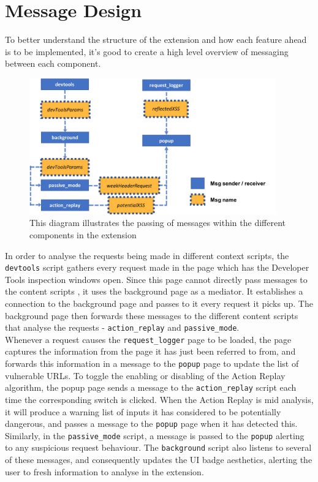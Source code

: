 \section{Message Design}

To better understand the structure of the extension and how each feature ahead is to be implemented, it's good to create a high level overview of messaging between each component.  \\

\begin{figure}[h]
	\centering
	\includegraphics[width=0.95\textwidth]{images/message_passing.png}
	\caption{This diagram illustrates the passing of messages within the different components in the extension}
	\label{fig:message_passing}
\end{figure}

In order to analyse the requests being made in different context scripts, the \texttt{devtools} script gathers every request made in the page which has the Developer Tools inspection windows open. Since this page cannot directly pass messages to the content scripts \cite{chromeExtensionDevTools}, it uses the background page as a mediator. It establishes a connection to the background page and passes to it every request it picks up. The background page then forwards these messages to the different content scripts that analyse the requests - \texttt{action\_replay} and \texttt{passive\_mode}. \\

Whenever a request causes the \texttt{request\_logger} page to be loaded, the page captures the information from the page it has just been referred to from, and forwards this information in a message to the \texttt{popup} page to update the list of vulnerable URLs. To toggle the enabling or disabling of the Action Replay algorithm, the popup page sends a message to the \texttt{action\_replay} script each time the corresponding switch is clicked. When the Action Replay is mid analysis, it will produce a warning list of inputs it has considered to be potentially dangerous, and passes a message to the \texttt{popup} page when it has detected this. Similarly, in the \texttt{passive\_mode} script, a message is passed to the \texttt{popup} alerting to any suspicious request behaviour. The \texttt{background} script also listens to several of these messages, and consequently updates the UI badge aesthetics, alerting the user to fresh information to analyse in the extension.

